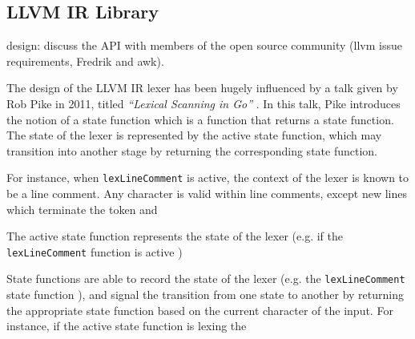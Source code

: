 
\subsection{LLVM IR Library}
\label{sec:impl_llvm_ir_library}







design: discuss the API with members of the open source community (llvm issue requirements, Fredrik and awk).

The design of the LLVM IR lexer has been hugely influenced by a talk given by Rob Pike in 2011, titled \textit{``Lexical Scanning in Go''} \cite{lexical_scanning_in_go}. In this talk, Pike introduces the notion of a state function which is a function that returns a state function. The state of the lexer is represented by the active state function, which may transition into another stage by returning the corresponding state function.

For instance, when \texttt{lexLineComment} is active, the context of the lexer is known to be a line comment. Any character is valid within line comments, except new lines which terminate the token and

The active state function represents the state of the lexer (e.g. if the \texttt{lexLineComment} function is active )

State functions are able to record the state of the lexer (e.g. the \texttt{lexLineComment} state function ), and signal the transition from one state to another by returning the appropriate state function based on the current character of the input. For instance, if the active state function is lexing the


